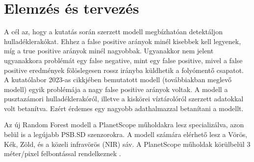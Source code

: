 \chapter{Elemzés és tervezés}
\label{ch:spec}

A cél az, hogy a kutatás során szerzett modell megbízhatóan detektáljon hulladéklerakókat. Ehhez a false positive arányok minél kisebbek kell legyenek, míg a true positive arányok minél nagyobbak. Ugyanakkor nem jelent ugyanakkora problémát egy false negative, mint egy false positive, mivel a false positive eredmények fölöslegesen rossz irányba küldhetik a folyómentő csapatot. 
A kutatólabor 2023-as cikkjében bemutatott modell (továbbiakban meglevő modell) egyik problémája a nagy false positive arányok voltak. A modell a pusztazámori hulladéklerakóról, illetve a kiskörei víztárolóról szerzett adatokkal volt betanítva. Ezért érdemes egy nagyobb adathalmazzal betanítani a modellt.

Az új Random Forest modell a PlanetScope műholdakra lesz specializálva, azon belül is a legújabb PSB.SD szenzorokra. A modell számára elérhető lesz a Vörös, Kék, Zöld, és a közeli infravörös (NIR) sáv. A PlanetScope műholdak körülbelül 3 méter/pixel felbontással rendelkeznek \cite{planetsensors2024,planetresolution2024}. 